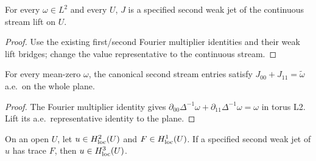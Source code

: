 \begin{lemma}
\label{lem:stream-weak-second-jet}
\leanok
For every $\omega\in L^2$ and every $U$, $J$ is a specified second weak jet
of the continuous stream lift on $U$.
\end{lemma}

\begin{proof}
\leanok
Use the existing first/second Fourier multiplier identities and their weak
lift bridges; change the value representative to the continuous stream.
\end{proof}

\begin{lemma}
\label{lem:canonical-stream-poisson}
\leanok
For every mean-zero $\omega$, the canonical second stream entries satisfy
$J_{00}+J_{11}=\widetilde\omega$ a.e.\ on the whole plane.
\end{lemma}

\begin{proof}
\leanok
The Fourier multiplier identity gives
$\partial_{00}\Delta^{-1}\omega+\partial_{11}\Delta^{-1}\omega=\omega$
in torus L2. Lift its a.e.\ representative identity to the plane.
\end{proof}

\begin{lemma}
\label{lem:elliptic-local}
\leanok
On an open $U$, let $u\in H^2_{\rm loc}(U)$ and $F\in H^1_{\rm loc}(U)$.
If a specified second weak jet of $u$ has trace $F$, then
$u\in H^3_{\rm loc}(U)$.
\end{lemma}

